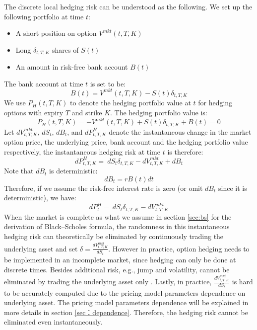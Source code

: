 \documentclass[letterpaper,12pt,titlepage,oneside,final]{book}
\numberwithin{equation}{section}
\theoremstyle{definition}
\newcommand{\Vmkt}{V^{mkt}}
\newcommand{\Smkt}{S}
\begin{document}
The discrete local hedging risk can be understood as the following.
We set up the following portfolio at time $t$:
\begin{itemize}
\item A short position on option $\Vmkt(t,T,K)$
\item Long $\delta_{t,T,K}$ shares of $\Smkt(t)$
\item An amount in risk-free bank account $B(t)$
\end{itemize}
The bank account  at time $t$ is set to be: 
\[
    B(t)=\Vmkt(t,T,K)-\Smkt(t) \delta_{t,T,K}
\]
We use $P_{H}(t,T,K)$ to denote the hedging portfolio value at $t$ for hedging options with expiry $T$ and strike $K$.
The hedging portfolio value is:
\[
    P_{H}(t,T,K)=-\Vmkt(t,T,K)+\Smkt(t) \delta_{t,T,K} +B(t)=0
\]
Let  $d\Vmkt_{t,T,K}$, $d\Smkt_{t}$, $d B_t$, and $d P^{H}_{t,T,K}$ denote the instantaneous change in the market option price, the underlying price,  bank account and the hedging portfolio value respectively, the instantaneous hedging risk at time $t$ is therefore:
\begin{equation}
    d P^{H}_{t,T,K}=\ d\Smkt_{t} \delta_{t,T,K}-d \Vmkt_{t,T,K}+ d B_t
\end{equation}
Note that $d B_t$ is deterministic:
\[
    d B_t=r B(t) dt
\]
Therefore, if we assume the risk-free interest rate is zero (or omit $d B_t$ since it is deterministic), we have:
\begin{equation}\label{eq:HE}
    d P^{H}_{t}=\ d\Smkt_{t} \delta_{t,T,K}-d \Vmkt_{t,T,K}
\end{equation}
When the market is complete as what we assume in section \ref{sec:bs} for the derivation of Black–Scholes formula, the randomness in this instantaneous hedging risk can theoretically be eliminated by continuously trading the underlying asset and set $\delta=\frac{d \Vmkt_{t,T,K}}{d\Smkt_{t}}$. However in practice, option hedging needs to be implemented in an incomplete market, since hedging can only be done at discrete times.
Besides additional risk, e.g., jump and volatility, cannot be eliminated by trading the underlying asset only \cite{heston1993closed,gatheral2011volatility}. Lastly, in practice, $\frac{d \Vmkt_{t,T,K}}{d\Smkt_{t}}$ is hard to be accurately computed due to the pricing model parameters dependence on underlying asset. The pricing model parameters dependence will be explained in more details in section \ref{sec：dependence}. 
 Therefore, the hedging risk cannot be eliminated even instantaneously. 
\end{document}
